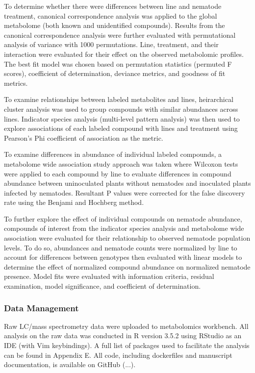 \documentclass[9pt,lineno]{elife}
\begin{document}
To determine whether there were differences between line and nematode treatment, canonical correspondence analysis was applied to the global metabolome (both known and unidentified compounds).  Results from the canonical correspondence analysis were further evaluated with permutational analysis of variance with 1000 permutations. Line, treatment, and their interaction were evaluated for their effect on the observed metabolomic profiles.  The best fit model was chosen based on permutation statistics (permuted F scores), coefficient of determination, deviance metrics, and goodness of fit metrics.  

To examine relationships between labeled metabolites and lines, heirarchical cluster analysis was used to group compounds with similar abundances across lines.  Indicator species analysis (multi-level pattern analysis) was then used to explore associations of each labeled compound with lines and treatment using Pearson's Phi coefficient of association as the metric. 

To examine differences in abundance of individual labeled compounds, a metabolome wide association study approach was taken where Wilcoxon tests were applied to each compound by line to evaluate differences in compound abundance between uninoculated plants without nematodes and inoculated plants infected by nematodes.  Resultant P values were corrected for the false discovery rate using the Benjami and Hochberg method.  

To further explore the effect of individual compounds on nematode abundance, compounds of interest from the indicator species analysis and metabolome wide association were evaluated for their relationship to observed nematode population levels.  To do so, abundances and nematode counts were normalized by line to account for differences between genotypes then evaluated with linear models to determine the effect of normalized compound abundance on normalized nematode presence. Model fits were evaluated with information criteria, residual examination, model significance, and coefficient of determination.  


\subsubsection{Data Management}

Raw LC/mass spectrometry data were uploaded to metabolomics workbench.  All analysis on the raw data was conducted in R version 3.5.2 using RStudio as an IDE (with Vim keybindings).  A full list of packages used to facilitate the analysis can be found in Appendix E.  All code, including dockerfiles and manuscript documentation, is available on GitHub (...).  
\end{document}
